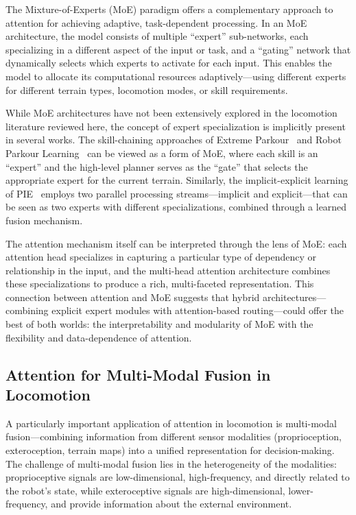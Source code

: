 The Mixture-of-Experts (MoE) paradigm offers a complementary approach to attention for achieving adaptive, task-dependent processing. In an MoE architecture, the model consists of multiple ``expert'' sub-networks, each specializing in a different aspect of the input or task, and a ``gating'' network that dynamically selects which experts to activate for each input. This enables the model to allocate its computational resources adaptively---using different experts for different terrain types, locomotion modes, or skill requirements.

While MoE architectures have not been extensively explored in the locomotion literature reviewed here, the concept of expert specialization is implicitly present in several works. The skill-chaining approaches of Extreme Parkour~\cite{cheng2024extremeparkour} and Robot Parkour Learning~\cite{zhuang2024robotparkour} can be viewed as a form of MoE, where each skill is an ``expert'' and the high-level planner serves as the ``gate'' that selects the appropriate expert for the current terrain. Similarly, the implicit-explicit learning of PIE~\cite{luo2024pie} employs two parallel processing streams---implicit and explicit---that can be seen as two experts with different specializations, combined through a learned fusion mechanism.

The attention mechanism itself can be interpreted through the lens of MoE: each attention head specializes in capturing a particular type of dependency or relationship in the input, and the multi-head attention architecture combines these specializations to produce a rich, multi-faceted representation. This connection between attention and MoE suggests that hybrid architectures---combining explicit expert modules with attention-based routing---could offer the best of both worlds: the interpretability and modularity of MoE with the flexibility and data-dependence of attention.

\subsection{Attention for Multi-Modal Fusion in Locomotion}

A particularly important application of attention in locomotion is multi-modal fusion---combining information from different sensor modalities (proprioception, exteroception, terrain maps) into a unified representation for decision-making. The challenge of multi-modal fusion lies in the heterogeneity of the modalities: proprioceptive signals are low-dimensional, high-frequency, and directly related to the robot's state, while exteroceptive signals are high-dimensional, lower-frequency, and provide information about the external environment.

